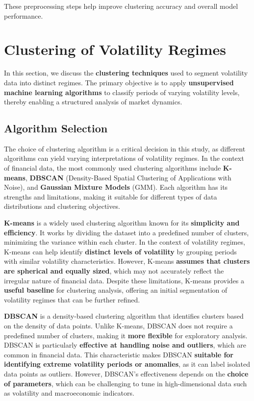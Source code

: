 These preprocessing steps help improve clustering accuracy and overall model performance.

\section{Clustering of Volatility Regimes}

In this section, we discuss the \textbf{clustering techniques} used to segment volatility data into distinct regimes. The primary objective is to apply \textbf{unsupervised machine learning algorithms} to classify periods of varying volatility levels, thereby enabling a structured analysis of market dynamics.

\subsection{Algorithm Selection}

The choice of clustering algorithm is a critical decision in this study, as different algorithms can yield varying interpretations of volatility regimes. In the context of financial data, the most commonly used clustering algorithms include \textbf{K-means}, \textbf{DBSCAN} (Density-Based Spatial Clustering of Applications with Noise), and \textbf{Gaussian Mixture Models} (GMM). Each algorithm has its strengths and limitations, making it suitable for different types of data distributions and clustering objectives.

\textbf{K-means} is a widely used clustering algorithm known for its \textbf{simplicity and efficiency}. It works by dividing the dataset into a predefined number of clusters, minimizing the variance within each cluster. In the context of volatility regimes, K-means can help identify \textbf{distinct levels of volatility} by grouping periods with similar volatility characteristics. However, K-means \textbf{assumes that clusters are spherical and equally sized}, which may not accurately reflect the irregular nature of financial data. Despite these limitations, K-means provides a \textbf{useful baseline} for clustering analysis, offering an initial segmentation of volatility regimes that can be further refined.

\textbf{DBSCAN} is a density-based clustering algorithm that identifies clusters based on the density of data points. Unlike K-means, DBSCAN does not require a predefined number of clusters, making it \textbf{more flexible} for exploratory analysis. DBSCAN is particularly \textbf{effective at handling noise and outliers}, which are common in financial data. This characteristic makes DBSCAN \textbf{suitable for identifying extreme volatility periods or anomalies}, as it can label isolated data points as outliers. However, DBSCAN’s effectiveness depends on the \textbf{choice of parameters}, which can be challenging to tune in high-dimensional data such as volatility and macroeconomic indicators.

